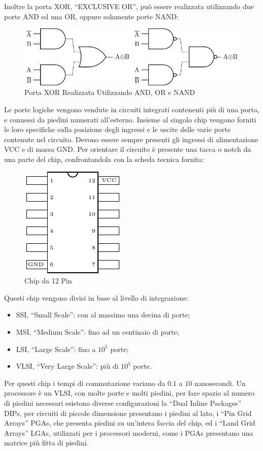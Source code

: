\documentclass{article}
\numberwithin{equation}{subsection}
\begin{document}
Inoltre la porta XOR, ``EXCLUSIVE OR'', può essere realizzata utilizzando due porte AND ed una OR, oppure solamente porte NAND:
\begin{figure}[H]%
    \centering%
    \includegraphics{porta-xor.pdf}%
    \caption{Porta XOR Realizzata Utilizzando AND, OR e NAND}%
\end{figure}

Le porte logiche vengono vendute in circuiti integrati contenenti più di una porta, e connessi da piedini numerati all'esterno. Insieme al singolo chip vengono forniti le loro specifiche sulla posizione degli ingressi 
e le uscite delle varie porte contenute nel circuito. Devono essere sempre presenti gli ingressi di alimentazione VCC e di massa GND. Per orientare il circuito è presente una tacca o notch da una parte del chip, 
confrontandola con la scheda tecnica fornita:
\begin{figure}[H]%
    \centering%
    \includegraphics{chip-integrato.pdf}%
    \caption{Chip da 12 Pin}%
\end{figure}
Questi chip vengono divisi in base al livello di integrazione:
\begin{itemize}
    \item SSI, ``Small Scale'': con al massimo una decina di porte;
    \item MSI, ``Medium Scale'': fino ad un centinaio di porte;
    \item LSI, ``Large Scale'': fino a $10^5$ porte;
    \item VLSI, ``Very Large Scale'': più di $10^5$ porte. 
\end{itemize}
Per questi chip i tempi di commutazione variano da $0.1$ a $10$ nanosecondi. 
Un processore è un VLSI, con molte porte e molti piedini, per fare spazio al numero di piedini necessari esistono diverse configurazioni la ``Dual Inline Packages'' DIPs, per circuiti di piccole dimensione 
presentano i piedini al lato, i ``Pin Grid Arrays'' PGAs, che presenta piedini su un'intera faccia del chip, ed i ``Land Grid Arrays'' LGAs, utilizzati per i processori moderni, come i PGAs presentano una matrice 
più fitta di piedini. 
\end{document}
